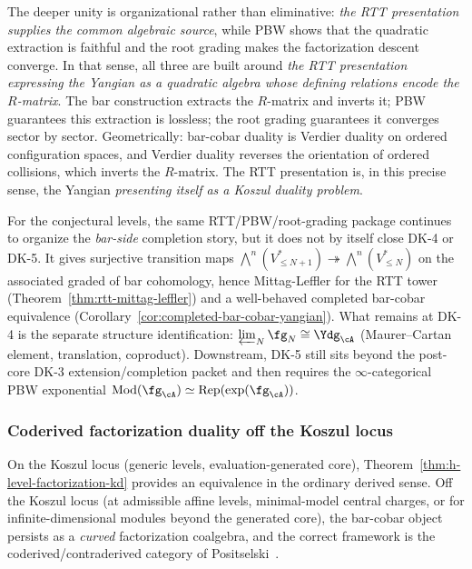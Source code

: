 \begin{remark}
The deeper unity is organizational rather than eliminative:
\emph{the RTT presentation supplies the common algebraic source},
while PBW shows that the quadratic extraction is faithful and the
root grading makes the factorization descent converge. In that
sense, all three are built around
\emph{the RTT presentation expressing the Yangian as a quadratic
algebra whose defining relations encode the $R$-matrix}.
The bar construction extracts the $R$-matrix and inverts it;
PBW guarantees this extraction is lossless; the root grading
guarantees it converges sector by sector. Geometrically:
bar-cobar duality is Verdier duality on ordered configuration
spaces, and Verdier duality reverses the orientation of ordered
collisions, which inverts the $R$-matrix. The RTT presentation
is, in this precise sense, the Yangian \emph{presenting itself as
a Koszul duality problem}.

For the conjectural levels, the same RTT/PBW/root-grading package
continues to organize the \emph{bar-side} completion story, but it
does not by itself close DK-4 or DK-5.
It gives surjective
transition maps $\bigwedge^n(V_{\leq N+1}^*) \twoheadrightarrow
\bigwedge^n(V_{\leq N}^*)$ on the associated graded of bar
cohomology, hence Mittag-Leffler for the RTT tower
(Theorem~\ref{thm:rtt-mittag-leffler}) and a well-behaved
completed bar-cobar equivalence
(Corollary~\ref{cor:completed-bar-cobar-yangian}).
What remains at DK-4 is the separate structure identification:
$\varprojlim_N \fg_N \cong \Ydg_\cA$
(Maurer--Cartan element, translation, coproduct).
Downstream, DK-5 still sits beyond the post-core DK-3
extension/completion packet and then requires the
$\infty$-categorical PBW exponential
$\operatorname{Mod}(\fg_\cA) \simeq
\operatorname{Rep}(\exp(\fg_\cA))$.
\end{remark}

\subsubsection*{Coderived factorization duality off the Koszul locus}

On the Koszul locus (generic levels, evaluation-generated core),
Theorem~\ref{thm:h-level-factorization-kd} provides an equivalence
in the ordinary derived sense. Off the Koszul locus (at admissible
affine levels, minimal-model central charges, or for infinite-dimensional
modules beyond the generated core), the bar-cobar object persists as a
\emph{curved} factorization coalgebra, and the correct framework is the
coderived/contraderived category of
Positselski~\cite{Positselski11}.


